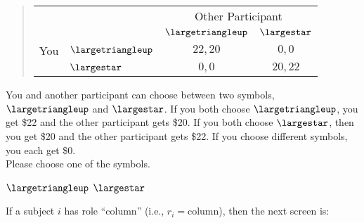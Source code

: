 \documentclass[11pt]{article}
\begin{document}
\begin{tcolorbox}
\begin{quote}
\begin{center}
\begin{tabular}{llcc}
    & & \multicolumn{2}{c}{Other Participant}  \\
& & $\largetriangleup$ & $\largestar$  \\ \cline{3-4}
You & $\largetriangleup$ & \multicolumn{1}{|c|}{$22,20$} & \multicolumn{1}{c|}{$0,0$}  \\ \cline{3-4}
& $\largestar$ & \multicolumn{1}{|c|}{$0,0$} & \multicolumn{1}{c|}{$20,22$}  \\ \cline{3-4}
\end{tabular}
\end{center}
\end{quote}


You and another participant can choose between two symbols, $\largetriangleup$ and $\largestar$. If you both choose $\largetriangleup$, you get \$22 and the other participant gets \$20. If you both choose $\largestar$, then you get \$20 and the other participant gets \$22. If you choose different symbols, you each get \$0.\\

Please choose one of the symbols.\\

\begin{center}
$\largetriangleup$ \qquad $\largestar$
\end{center}
\end{tcolorbox}

If a subject $i$ has role ``column'' (i.e., $r_i=\text{column}$), then the next screen is:
\end{document}
